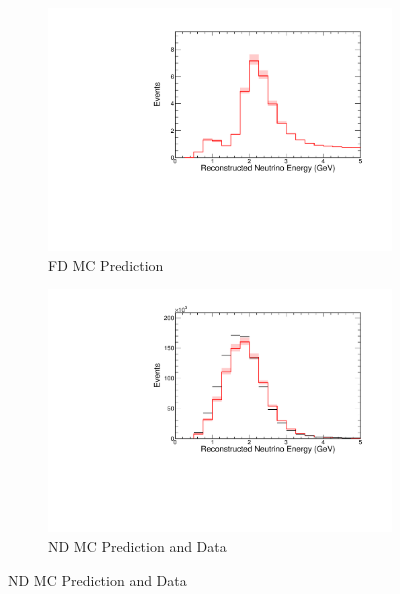 {\begin{figure}
\begin{center}
\begin{subfigure}[c]{0.49\textwidth}
\includegraphics[width=\textwidth]{figures/systs/prediction/fd_mc_prediction_MaCCQE.pdf}
\caption*{FD MC Prediction}
\end{subfigure}
\begin{subfigure}[c]{0.49\textwidth}
\includegraphics[width=\textwidth]{figures/systs/prediction/nd_mc_prediction_MaCCQE.pdf}
\caption*{ND MC Prediction and Data}
\end{subfigure}

\vspace{20pt}


\end{center}
\end{figure}}
